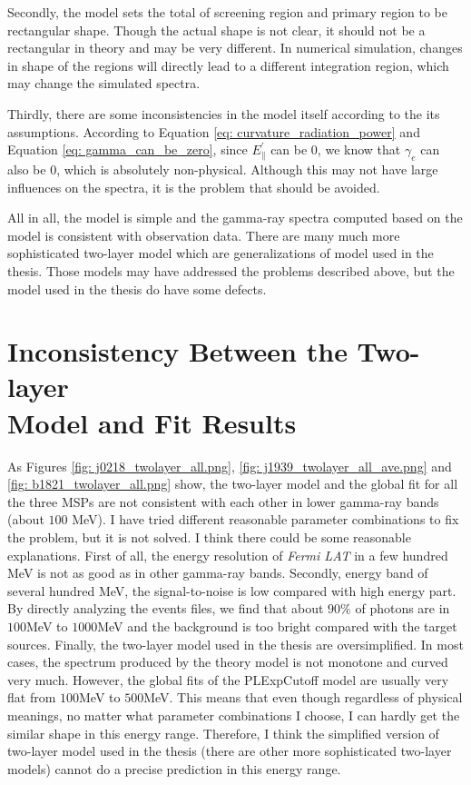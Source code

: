 \documentclass[12pt]{report}
\begin{document}
    Secondly, the model sets the total of screening region and primary region to be 
    rectangular shape. Though the actual shape is not clear, it should not be a 
    rectangular in theory and may be very different. In numerical simulation, changes 
    in shape of the regions will directly lead to a different integration region, 
    which may change the simulated spectra.
  
    Thirdly, there are some inconsistencies in the model itself according to the its 
    assumptions. According to Equation \ref{eq: curvature_radiation_power} and Equation 
    \ref{eq: gamma_can_be_zero}, since $E_{\parallel}^{\prime}$ can be $0$, we know that 
    $\gamma_{e}$ can also be $0$, which is absolutely non-physical. Although this may not 
    have large influences on the spectra, it is the problem that should be avoided.

    All in all, the model is simple and the gamma-ray spectra computed based on the model 
    is consistent with observation data. There are many much more sophisticated 
    two-layer model which are generalizations of model used in the thesis. Those models 
    may have addressed the problems described above, but the model used in the thesis 
    do have some defects.  
      
  \section{Inconsistency Between the Two-layer \\ Model and Fit Results}
    As Figures \ref{fig: j0218_twolayer_all.png}, \ref{fig: j1939_twolayer_all_ave.png} and 
    \ref{fig: b1821_twolayer_all.png} show, the two-layer model and the global fit for all 
    the three MSPs are not consistent with each other in lower gamma-ray bands (about $100$ 
    MeV). I have tried different reasonable parameter combinations to fix the problem, but 
    it is not solved. I think there could be some reasonable explanations. First of all, 
    the energy resolution of \textit{Fermi LAT} in a few hundred MeV is not as good as in 
    other gamma-ray bands. Secondly, energy band of several hundred MeV, the signal-to-noise 
    is low compared with high energy part. By directly analyzing the events files, we find that 
    about $90\%$ of photons are in $100$MeV to $1000$MeV and the background is too bright 
    compared with the target sources. Finally, the two-layer model used in the thesis are 
    oversimplified. In most cases, the spectrum produced by the theory model is not monotone and 
    curved very much. However, the global fits of the PLExpCutoff model are usually very 
    flat from $100$MeV to $500$MeV. This means that even though regardless of physical meanings,
    no matter what parameter combinations I choose, I can hardly get the similar shape in this 
    energy range. Therefore, I think the simplified version of two-layer model used in the 
    thesis (there are other more sophisticated two-layer models) cannot do a precise prediction 
    in this energy range. 
    
\end{document}
